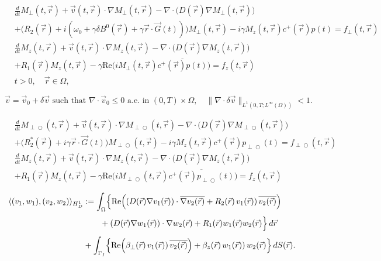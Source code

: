 \documentclass[10pt,a4paper]{amsart}
\def\Mpp{M_{\perp\!\!\!\!\!\bigcirc}}
\renewcommand\Re{\mathrm{Re}}
\def\fpp{f_{\perp\!\!\!\!\!\bigcirc}}
\def\pp{p_{\perp\!\!\!\!\!\bigcirc}}
\begin{document}
\begin{equation}\label{eqn:bloch-torrey-complex_f}
\begin{aligned}
&\frac{d}{dt}M_\perp(t, \vec r)+{\vec v}(t, \vec r)\cdot\nabla M_\perp(t, \vec r) -\nabla\cdot\bigl(D(\vec r) \nabla M_\perp(t, \vec r)\bigr) \\
&+\bigl(R_2(\vec r)+i(\omega_0 + \gamma\delta B^0(\vec r) + \gamma\vec r \cdot \vec G(t))
\bigr)M_\perp(t, \vec r)-i\gamma M_z(t, \vec r)c^+(\vec r)p(t)=f_\perp(t, \vec r)\\    
&\frac{d}{dt}M_z(t, \vec r)+{\vec v}(t, \vec r)\cdot\nabla M_z(t, \vec r) -\nabla\cdot\bigl(D(\vec r) \nabla M_z(t, \vec r)\bigr) \\
&+R_1(\vec r) M_z(t, \vec r)
-\gamma\Re\bigl(iM_\perp(t, \vec r)\overline{c^+(\vec r)p(t)}\bigr)=f_z(t, \vec r)
\\
&t>0, \quad \vec r\in\Omega,
\end{aligned}
\end{equation}

\begin{equation}\label{divv}
{\vec v}={\vec v}_0+\delta {\vec v}\text{ such that }\nabla\cdot{\vec v}_0\leq0\text{ a.e. in }(0,T)\times\Omega, \quad \|\nabla\cdot\delta{\vec v}\|_{L^1(0,T;L^\infty(\Omega))}<1. 
\end{equation}

\begin{equation}\label{eqn:bloch-torrey-complex_rot_f}
\begin{aligned}
&\frac{d}{dt}\Mpp(t, \vec r)+{\vec v}(t, \vec r)\cdot\nabla \Mpp(t, \vec r) -\nabla\cdot\bigl(D(\vec r) \nabla \Mpp(t, \vec r)\bigr) \\
&+\bigl(R_2^*(\vec r)+i\gamma\vec r \cdot \vec G(t)\bigr)\Mpp(t, \vec r)
-i\gamma M_z(t, \vec r)c^+(\vec r)\pp(t)= \fpp(t, \vec r)\\    
&\frac{d}{dt}M_z(t, \vec r)+{\vec v}(t, \vec r)\cdot\nabla M_z(t, \vec r) -\nabla\cdot\bigl(D(\vec r) \nabla M_z(t, \vec r)\bigr) \\
&+R_1(\vec r) M_z(t, \vec r)
-\gamma\Re\bigl(i\Mpp(t, \vec r)\overline{c^+(\vec r)\pp(t)}\bigr)=f_z(t, \vec r)
\end{aligned}
\end{equation}

\begin{equation}\label{HD1}
\begin{aligned}
&\langle (v_1,w_1),(v_2,w_2)\rangle_{H_D^1} :=
\int_\Omega\Bigl\{ \Re\Bigl((D(\vec r) \nabla v_1(\vec r))\cdot \overline{\nabla v_2(\vec r)}
+R_2(\vec r)\,v_1(\vec r))\, \overline{v_2(\vec r)}\Bigr)\\    
&\phantom{\langle (v_1,w_1),(v_2,w_2)\rangle := \int_\Omega\Bigl(}
+(D(\vec r) \nabla w_1(\vec r))\cdot \nabla w_2(\vec r)
+R_1(\vec r) w_1(\vec r)w_2(\vec r)\Bigr\}\, d \vec r\\
&\phantom{\langle (v_1,w_1),(v_2,w_2)\rangle :=}
+\int_{\Gamma_I}\Bigl\{\Re\Bigl(\beta_\perp(\vec r)\,v_1(\vec r))\, \overline{v_2(\vec r)}\Bigr)
+\beta_z(\vec r)\,w_1(\vec r))\, w_2(\vec r)\Bigr\}\, dS(\vec r).
\end{aligned}
\end{equation}
\end{document}
